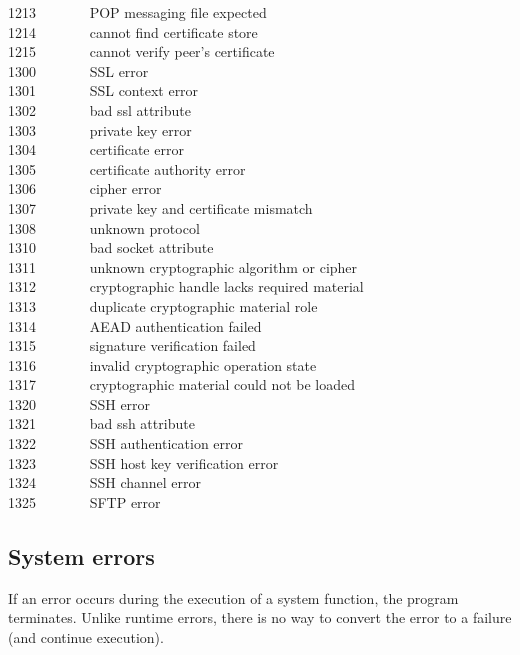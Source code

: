 1213 \ \ \ \ \ \ \ POP messaging file expected\\
1214 \ \ \ \ \ \ \ cannot find certificate store\\
1215 \ \ \ \ \ \ \ cannot verify peer's certificate\\
1300 \ \ \ \ \ \ \ SSL error\\
1301 \ \ \ \ \ \ \ SSL context error\\
1302 \ \ \ \ \ \ \ bad ssl attribute\\
1303 \ \ \ \ \ \ \ private key error\\
1304 \ \ \ \ \ \ \ certificate error\\
1305 \ \ \ \ \ \ \ certificate authority error\\
1306 \ \ \ \ \ \ \ cipher error\\
1307 \ \ \ \ \ \ \ private key and certificate mismatch\\
1308 \ \ \ \ \ \ \ unknown protocol\\
1310 \ \ \ \ \ \ \ bad socket attribute\\
1311 \ \ \ \ \ \ \ unknown cryptographic algorithm or cipher\\
1312 \ \ \ \ \ \ \ cryptographic handle lacks required material\\
1313 \ \ \ \ \ \ \ duplicate cryptographic material role\\
1314 \ \ \ \ \ \ \ AEAD authentication failed\\
1315 \ \ \ \ \ \ \ signature verification failed\\
1316 \ \ \ \ \ \ \ invalid cryptographic operation state\\
1317 \ \ \ \ \ \ \ cryptographic material could not be loaded\\
1320 \ \ \ \ \ \ \ SSH error\\
1321 \ \ \ \ \ \ \ bad ssh attribute\\
1322 \ \ \ \ \ \ \ SSH authentication error\\
1323 \ \ \ \ \ \ \ SSH host key verification error\\
1324 \ \ \ \ \ \ \ SSH channel error\\
1325 \ \ \ \ \ \ \ SFTP error\\

\subsection*{System errors}

If an error occurs during the execution of a system
function, the program terminates. Unlike runtime errors, there is no way
to convert the error to a failure (and continue execution).


